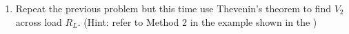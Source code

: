 \begin{enumerate}

\item Repeat the previous problem but this time use Thevenin's theorem to find
$V_2$ across load $R_L$. (Hint: refer to Method 2 in the example shown in the
)


\end{enumerate}
